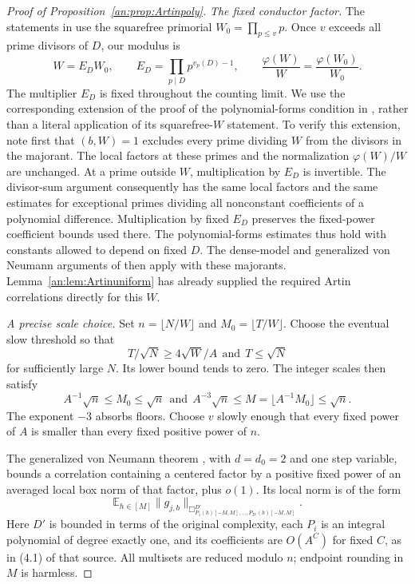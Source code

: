 \documentclass[11pt,reqno]{amsart}
\theoremstyle{definition}
\numberwithin{equation}{section}
\def\t{\text}
\begin{document}
\begin{proof}[Proof of Proposition~\ref{an:prop:Artinpoly}]
\emph{The fixed conductor factor.}
The statements in \cite[Sections 3--4]{TZpoly} use the squarefree primorial $W_0=\prod_{p\le v}p$. Once $v$ exceeds all prime divisors of $D$, our modulus is
\[
 W=E_DW_0,\qquad
 E_D=\prod_{p\mid D}p^{v_p(D)-1},
 \qquad \frac{\varphi(W)}W=\frac{\varphi(W_0)}{W_0}.
\]
The multiplier $E_D$ is fixed throughout the counting limit. We use the corresponding extension of the proof of the polynomial-forms condition in \cite[Appendix A]{TZpoly}, rather than a literal application of its squarefree-$W$ statement. To verify this extension, note first that $(b,W)=1$ excludes every prime dividing $W$ from the divisors in the majorant. The local factors at these primes and the normalization $\varphi(W)/W$ are unchanged. At a prime outside $W$, multiplication by $E_D$ is invertible. The divisor-sum argument consequently has the same local factors and the same estimates for exceptional primes dividing all nonconstant coefficients of a polynomial difference. Multiplication by fixed $E_D$ preserves the fixed-power coefficient bounds used there. The polynomial-forms estimates thus hold with constants allowed to depend on fixed $D$. The dense-model and generalized von Neumann arguments of \cite[Corollary 3.9 and Theorem 4.1]{TZpoly} then apply with these majorants. Lemma~\ref{an:lem:Artinuniform} has already supplied the required Artin correlations directly for this $W$.

\emph{A precise scale choice.}
Set $n=\lfloor N/W\rfloor$ and $M_0=\lfloor T/W\rfloor$. Choose the eventual slow threshold so that
\begin{equation}\label{an:eq:outerthreshold}
 T/\sqrt N\ge4\sqrt W/A\ \ \t{and}\ \ T\le\sqrt N
\end{equation}
for sufficiently large $N$. Its lower bound tends to zero. The integer scales then satisfy
\begin{equation}\label{an:eq:innerscales}
 A^{-1}\sqrt n\le M_0\le\sqrt n\ \ \t{and}\ \
 A^{-3}\sqrt n\le M=\lfloor A^{-1}M_0\rfloor\le\sqrt n.
\end{equation}
The exponent $-3$ absorbs floors. Choose $v$ slowly enough that every fixed power of $A$ is smaller than every fixed positive power of $n$.

The generalized von Neumann theorem \cite[Theorem 4.1]{TZpoly}, with $d=d_0=2$ and one step variable, bounds a correlation containing a centered factor by a positive fixed power of an averaged local box norm of that factor, plus $o(1)$. Its local norm is of the form
\begin{equation}\label{an:eq:localnormtarget}
 \mathbb E_{h\in[M]}
    \|g_{j,b}\|_{\Box^{D'}_{P_1(h)[-M,M],\ldots,P_{D'}(h)[-M,M]}}.
\end{equation}
Here $D'$ is bounded in terms of the original complexity, each $P_i$ is an integral polynomial of degree exactly one, and its coefficients are $O(A^C)$ for fixed $C$, as in (4.1) of that source. All multisets are reduced modulo $n$; endpoint rounding in $M$ is harmless.


\end{proof}
\end{document}
